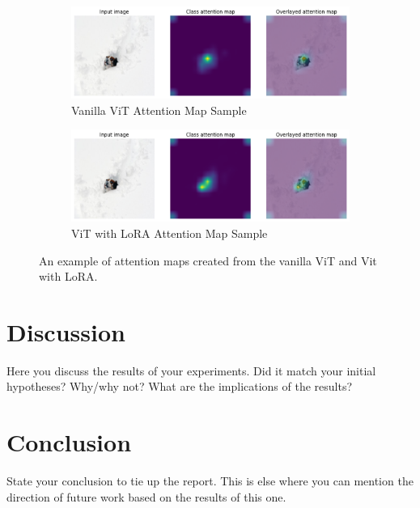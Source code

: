 \documentclass[10pt]{article}
\begin{document}
\begin{figure}[htbp]
    \centering
    \begin{subfigure}[b]{0.9\textwidth}
        \centering
        \includegraphics[width=\textwidth]{images/vit_attention.png} %
        \caption{Vanilla ViT Attention Map Sample}
        \label{fig:vit_attentionmap}
    \end{subfigure}

    \vspace{0.5cm} %

    \begin{subfigure}[b]{0.9\textwidth}
        \centering
        \includegraphics[width=\textwidth]{images/lora_attention.png} %
        \caption{ViT with LoRA Attention Map Sample}
        \label{fig:lora_attentionmap}
    \end{subfigure}

    \caption{An example of attention maps created from the vanilla ViT and Vit with LoRA.}
    \label{fig:attentionmaps}
\end{figure}

\section{Discussion}
Here you discuss the results of your experiments. Did it match your initial hypotheses? Why/why not? What are the implications of the results?

\section{Conclusion}
State your conclusion to tie up the report. This is else where you can mention the direction of future work based on the results of this one.
\end{document}
